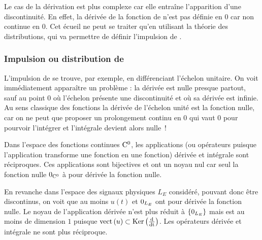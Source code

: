 \begin{remark}{}
	Le cas de la dérivation est plus complexe car elle entraîne
        l'apparition d'une discontinuité. En effet, la dérivée de la
        fonction de \Heaviside{} n'est pas définie en $0$ car non
        continue en $0$. Cet écueil ne peut se traiter qu'en utilisant
        la théorie des distributions, qui va permettre de définir
        l'impulsion de \Dirac.
	
	\subsubsection{Impulsion ou distribution de \Dirac}
	
	L'impulsion de \Dirac{} se trouve, par exemple, en
        différenciant l'échelon unitaire. On voit immédiatement
        apparaître un problème : la dérivée est nulle presque partout,
        sauf au point 0 où l'échelon présente une discontinuité et où
        sa dérivée est infinie. Au sens classique des fonctions la
        dérivée de l'échelon unité est la fonction nulle, car on ne
        peut que proposer un prolongement continu en $0$ qui vaut $0$
        pour pourvoir l'intégrer et l'intégrale devient alors nulle~!

        \begin{remarque}
          Dans l'espace des fonctions continues $\mathrm{C}^0$, les
          applications (ou opérateurs puisque l'application transforme
          une fonction en une fonction) dérivée et intégrale
          sont réciproques. Ces applications sont bijectives et ont un
          noyau nul car seul la fonction nulle $\mathrm{0}_{\mathrm{C}^0}$
          à pour dérivée la fonction nulle.

          En revanche dans l'espace des signaux physiques $L_E$
          considéré, pouvant donc être discontinus, on voit que au
          moins $u(t)$ et $\mathrm{0}_{L_E}$ ont pour dérivée la fonction
          nulle. Le noyau de l'application dérivée n'est plus réduit à
          $\{\mathrm{0}_{L_E}\}$ mais est au moins de dimension $1$
          puisque $\mathrm{vect}\left(u\right) \subset \mathrm{Ker}\left(\frac{\mathrm{d{}}}{\mathrm{d{t}}}\right)$. Les opérateurs
          dérivée et intégrale ne sont plus réciproque.
        \end{remarque}
        

\end{remark}
